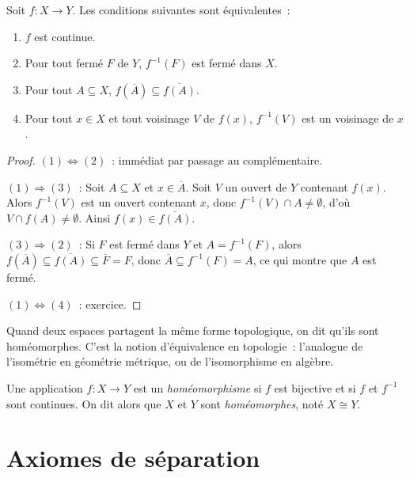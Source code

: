 \begin{proposition}
Soit $f\colon X \to Y$. Les conditions suivantes sont \'equivalentes~:
\begin{enumerate}
  \item $f$ est continue.
  \item Pour tout ferm\'e $F$ de $Y$, $f^{-1}(F)$ est ferm\'e dans $X$.
  \item Pour tout $A \subseteq X$, $f(\overline{A}) \subseteq \overline{f(A)}$.
  \item Pour tout $x \in X$ et tout voisinage $V$ de $f(x)$, $f^{-1}(V)$ est un
    voisinage de $x$.
\end{enumerate}
\end{proposition}

\begin{proof}
$(1) \Leftrightarrow (2)$~: imm\'ediat par passage au compl\'ementaire.

$(1) \Rightarrow (3)$~: Soit $A \subseteq X$ et $x \in \overline{A}$. Soit $V$ un ouvert
de $Y$ contenant $f(x)$. Alors $f^{-1}(V)$ est un ouvert contenant $x$, donc
$f^{-1}(V) \cap A \neq \emptyset$, d'o\`u $V \cap f(A) \neq \emptyset$. Ainsi
$f(x) \in \overline{f(A)}$.

$(3) \Rightarrow (2)$~: Si $F$ est ferm\'e dans $Y$ et $A = f^{-1}(F)$, alors
$f(\overline{A}) \subseteq \overline{f(A)} \subseteq \overline{F} = F$, donc
$\overline{A} \subseteq f^{-1}(F) = A$, ce qui montre que $A$ est ferm\'e.

$(1) \Leftrightarrow (4)$~: exercice.
\end{proof}

Quand deux espaces partagent la m\^eme \og forme topologique\fg, on dit qu'ils
sont hom\'eomorphes. C'est la notion d'\'equivalence en topologie~:
l'analogue de l'isom\'etrie en g\'eom\'etrie m\'etrique, ou de l'isomorphisme en
alg\`ebre.

\begin{definition}
Une application $f\colon X \to Y$ est un \emph{hom\'eomorphisme} si $f$ est bijective et
si $f$ et $f^{-1}$ sont continues. On dit alors que $X$ et $Y$ sont \emph{hom\'eomorphes},
not\'e $X \cong Y$.
\end{definition}

\section{Axiomes de s\'eparation}

